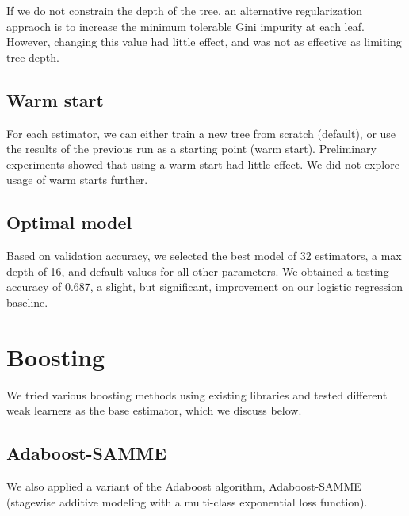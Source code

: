 \documentclass{article}
\begin{document}
\begin{multicols}{2}
If we do not constrain the depth of the tree,
an alternative regularization appraoch
is to increase the minimum tolerable Gini impurity at each leaf.
However,
changing this value had little effect,
and was not as effective as limiting tree depth.

\subsection{Warm start}

For each estimator,
we can either train a new tree from scratch (default),
or use the results of the previous run
as a starting point (warm start).
Preliminary experiments showed that using a warm start
had little effect.
We did not explore usage of warm starts further.

\subsection{Optimal model}

Based on validation accuracy,
we selected the best model
of 32 estimators, a max depth of 16,
and default values for all other parameters.
We obtained a testing accuracy of 0.687,
a slight, but significant, improvement
on our logistic regression baseline.

\section{Boosting}

We tried various boosting methods using existing libraries
and tested different weak learners as the base estimator,
which we discuss below.

\subsection{Adaboost-SAMME}

We also applied a variant of the Adaboost algorithm,
Adaboost-SAMME (stagewise additive modeling
with a multi-class exponential loss function).


\end{multicols}
\end{document}
